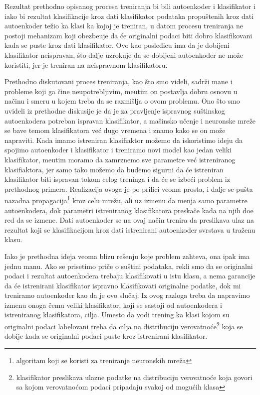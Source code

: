 \documentclass{article}
\begin{document}
	Rezultat prethodno opisanog procesa treniranja bi bili autoenkoder i klasifikator i iako bi rezultat klasifikacije kroz dati klasifikator podataka propu\v stenih kroz dati autoenkoder te\v zio ka klasi ka kojoj je treniran, u datom procesu treniranja ne postoji mehanizam koji obezbe\dj uje da \'ce originalni podaci biti dobro klasifikovani kada se puste kroz dati klasifikator.
	Ovo kao posledicu ima da je dobijeni klasifikator neispravan, \v sto dalje uzrokuje da se dobijeni autoenkoder ne mo\v ze koristiti, jer je treniran na neispravnom klasifikatoru.
	
	Prethodno diskutovani proces treniranja, kao \v sto smo videli, sadr\v zi mane i probleme koji ga \v cine neupotrebljivim, me\dj utim on postavlja dobru osnovu u na\v cinu i smeru u kojem treba da se razmi\v slja o ovom problemu.
	Ono \v sto smo uvideli iz prethodne diskusije je da je za pravljenje ispravnog su\v stinskog autoenkodera potreban ispravan klasifikator, a ma\v sinsko u\v cenje i neuronske mre\v ze se bave temom klasifikatora ve\'c dugo vremena i znamo kako se on mo\v ze napraviti.
	Kada imamo istreniran klasifiaktor mo\v zemo da iskoristimo ideju da spojimo autoenkoder i klasifikator i treniramo novi model kao jedan veliki klasifikator, me\dj utim moramo da zamrznemo sve parametre ve\'c istreniranog klasifiaktora, jer samo tako mo\v zemo da budemo sigurni da \'ce istreniran klasifikator biti ispravan tokom celog treninga i da \'ce se izbe\'ci problem iz prethodnog primera.
	Realizacija ovoga je po prilici veoma prosta, i dalje se pu\v sta nazadna propagacija\footnote{algoritam koji se koristi za treniranje neuronskih mre\v za} kroz celu mre\v zu, ali uz izmenu da menja samo parametre autoenkodera, dok parametri istreniranog klasifikatora preska\v ce kada na njih do\dj e red da se izmene.
	Dati autoenkoder se na ovaj na\v cin trenira da preslikava ulaz na rezultat koji se klasifikacijom kroz dati istrenirani autoenkoder svrstava u tra\v zenu klasu.
	
	Iako je prethodna ideja veoma blizu re\v senju koje problem zahteva, ona ipak ima jednu manu. 
	Ako se prisetimo pri\v ce o su\v stini podataka, rekli smo da se originalni podaci i rezultat autoenkodera trebaju klasifikovati u istu klasu, a nema garancije da \'ce istrenirani klasifikator ispravno klasifikovati originalne podatke, dok mi treniramo autoenkoder kao da je ovo slu\v caj.
	Iz ovog razloga treba da napravimo izmenu onoga \v cemu veliki klasifikator, koji se sastoji od autoenkodera i istreniranog klasifikatora, cilja.
	Umesto da vodi trening ka klasi kojom su originalni podaci labelovani treba da cilja na distribuciju verovatno\'ce\footnote{klasifikator preslikava ulazne podatke na distribuciju verovatno\'ce koja govori sa kojom verovatno\'com podaci pripadaju svakoj od mogu\'cih klasa} koja se dobije kada se originalni podaci puste kroz istrenirani klasifikator.
	
\end{document}
